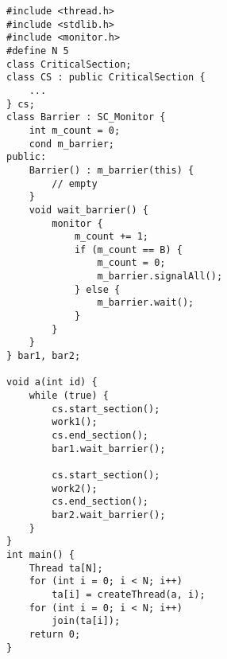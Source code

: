 \begin{lstlisting}
#include <thread.h>
#include <stdlib.h>
#include <monitor.h>
#define N 5
class CriticalSection;
class CS : public CriticalSection {
    ...
} cs;
class Barrier : SC_Monitor {
    int m_count = 0;
    cond m_barrier;
public:
    Barrier() : m_barrier(this) {
        // empty
    }
    void wait_barrier() {
        monitor {
            m_count += 1;
            if (m_count == B) {
                m_count = 0;
                m_barrier.signalAll();
            } else {
                m_barrier.wait();
            }
        }
    }
} bar1, bar2;

void a(int id) {
    while (true) {
        cs.start_section();
        work1();
        cs.end_section();
        bar1.wait_barrier();

        cs.start_section();
        work2();
        cs.end_section();
        bar2.wait_barrier();
    }
}
int main() {
    Thread ta[N];
    for (int i = 0; i < N; i++) 
        ta[i] = createThread(a, i);
    for (int i = 0; i < N; i++) 
        join(ta[i]);
    return 0;
}

\end{lstlisting}


